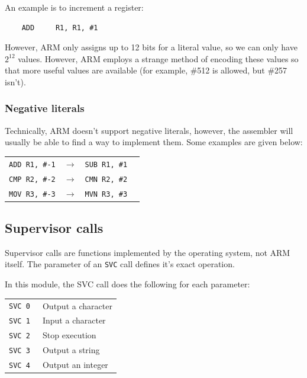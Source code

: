\documentclass{article}
\begin{document}
An example is to increment a register:

\begin{verbatim}
	ADD 	R1, R1, #1
\end{verbatim}

However, ARM only assigns up to 12 bits for a literal value, so we can only have $2^{12}$ values. However, ARM employs a strange method of encoding these values so that more useful values are available (for example, \#512 is allowed, but \#257 isn't).

\subsubsection{Negative literals}

Technically, ARM doesn't support negative literals, however, the assembler will usually be able to find a way to implement them. Some examples are given below:

\begin{center}
    \begin{tabular}{l l l r}
        {\tt ADD R1, \#-1} & $\rightarrow$ & {\tt SUB R1, \#1}\\
        {\tt CMP R2, \#-2} & $\rightarrow$ & {\tt CMN R2, \#2}\\
        {\tt MOV R3, \#-3} & $\rightarrow$ & {\tt MVN R3, \#3}\\
    \end{tabular}
\end{center}

\subsection{Supervisor calls}

Supervisor calls are functions implemented by the operating system, not ARM itself. The parameter of an {\tt SVC} call defines it's exact operation.

In this module, the SVC call does the following for each parameter:

\begin{tabularx}{\textwidth}{l X}
	{\tt SVC 0 } & Output a character \\
	{\tt SVC 1 } & Input a character \\
	{\tt SVC 2 } & Stop execution \\
	{\tt SVC 3 } & Output a string \\
	{\tt SVC 4 } & Output an integer \\
\end{tabularx}
\end{document}
